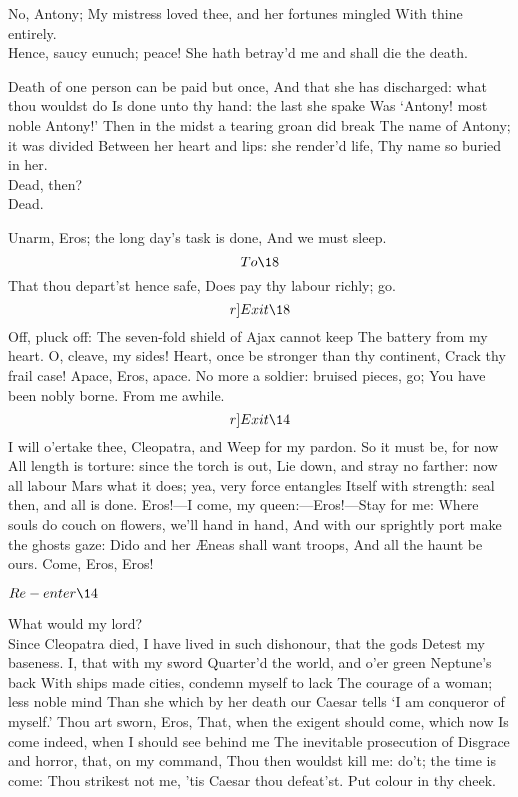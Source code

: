 \documentclass{book}
\begin{document}
	No, Antony;
	My mistress loved thee, and her fortunes mingled
	With thine entirely. \\

\1	Hence, saucy eunuch; peace!
	She hath betray'd me and shall die the death.

	Death of one person can be paid but once,
	And that she has discharged: what thou wouldst do
	Is done unto thy hand: the last she spake
	Was `Antony! most noble Antony!'
	Then in the midst a tearing groan did break
	The name of Antony; it was divided
	Between her heart and lips: she render'd life,
	Thy name so buried in her. \\

\1	Dead, then? \\

	Dead.

\1	Unarm, Eros; the long day's task is done,
	And we must sleep. \[To \18\] That thou depart'st hence safe,
	Does pay thy labour richly; go.\\ \[r]Exit \18\]
		         Off, pluck off:
	The seven-fold shield of Ajax cannot keep
	The battery from my heart. O, cleave, my sides!
	Heart, once be stronger than thy continent,
	Crack thy frail case! Apace, Eros, apace.
	No more a soldier: bruised pieces, go;
	You have been nobly borne. From me awhile. \[r]Exit \14\]
	I will o'ertake thee, Cleopatra, and
	Weep for my pardon. So it must be, for now
	All length is torture: since the torch is out,
	Lie down, and stray no farther: now all labour
	Mars what it does; yea, very force entangles
	Itself with strength: seal then, and all is done.
	Eros!---I come, my queen:---Eros!---Stay for me:
	Where souls do couch on flowers, we'll hand in hand,
	And with our sprightly port make the ghosts gaze:
	Dido and her \AE{}neas shall want troops, 
	And all the haunt be ours. Come, Eros, Eros! 

	\(Re-enter \14\)

 What would my lord? \\


\1	Since Cleopatra died,
	I have lived in such dishonour, that the gods
	Detest my baseness. I, that with my sword
	Quarter'd the world, and o'er green Neptune's back
	With ships made cities, condemn myself to lack
	The courage of a woman; less noble mind
	Than she which by her death our Caesar tells
	`I am conqueror of myself.' Thou art sworn, Eros,
	That, when the exigent should come, which now
	Is come indeed, when I should see behind me
	The inevitable prosecution of
	Disgrace and horror, that, on my command,
	Thou then wouldst kill me: do't; the time is come:
	Thou strikest not me, 'tis Caesar thou defeat'st.
	Put colour in thy cheek. \\
\end{document}

